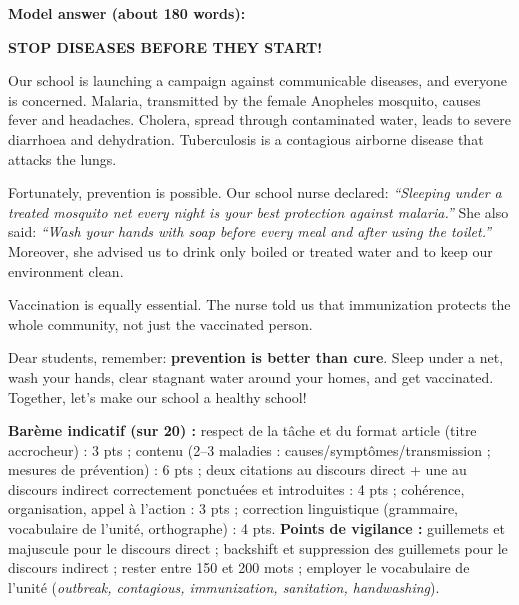 \documentclass[11pt]{article}
\begin{document}
\begin{corrige}
\textbf{Model answer (about 180 words):}

\textbf{STOP DISEASES BEFORE THEY START!}

Our school is launching a campaign against communicable diseases, and everyone is concerned. Malaria, transmitted by the female Anopheles mosquito, causes fever and headaches. Cholera, spread through contaminated water, leads to severe diarrhoea and dehydration. Tuberculosis is a contagious airborne disease that attacks the lungs.

Fortunately, prevention is possible. Our school nurse declared: \emph{``Sleeping under a treated mosquito net every night is your best protection against malaria.''} She also said: \emph{``Wash your hands with soap before every meal and after using the toilet.''} Moreover, she advised us to drink only boiled or treated water and to keep our environment clean.

Vaccination is equally essential. The nurse told us that immunization protects the whole community, not just the vaccinated person.

Dear students, remember: \textbf{prevention is better than cure}. Sleep under a net, wash your hands, clear stagnant water around your homes, and get vaccinated. Together, let's make our school a healthy school!

\textbf{Barème indicatif (sur 20) :} respect de la tâche et du format article (titre accrocheur) : 3 pts ; contenu (2--3 maladies : causes/symptômes/transmission ; mesures de prévention) : 6 pts ; deux citations au discours direct + une au discours indirect correctement ponctuées et introduites : 4 pts ; cohérence, organisation, appel à l'action : 3 pts ; correction linguistique (grammaire, vocabulaire de l'unité, orthographe) : 4 pts.
\textbf{Points de vigilance :} guillemets et majuscule pour le discours direct ; backshift et suppression des guillemets pour le discours indirect ; rester entre 150 et 200 mots ; employer le vocabulaire de l'unité (\emph{outbreak, contagious, immunization, sanitation, handwashing}).
\end{corrige}
\end{document}
